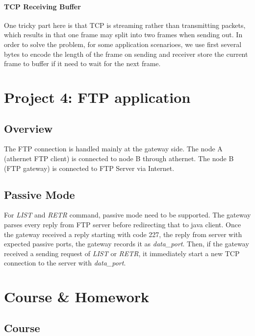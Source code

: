 \documentclass[conference,compsoc]{IEEEtran}
\begin{document}
		\paragraph{\textbf{TCP Receiving Buffer}}
		 One tricky part here is that TCP is streaming rather than transmitting packets, which results in that one frame may split into two frames when sending out. In order to solve the problem, for some application scenarioes, we use first several bytes to encode the length of the frame on sending and receiver store the current frame to buffer if it need to wait for the next frame.
		

\section{Project 4: FTP application}
	\subsection{Overview}	
	The FTP connection is handled mainly at the gateway side. The node A (athernet FTP client) is connected to node B through athernet. The node B (FTP gateway) is connected to FTP Server via Internet.
	\subsection{Passive Mode}
	For \emph{LIST} and \emph{RETR} command, passive mode need to be supported. The gateway parses every reply from FTP server before redirecting that to java client. Once the gateway received a reply starting with code 227, the reply from server with expected passive ports, the gateway records it as \emph{data\_port}. Then, if the gateway received a sending request of \emph{LIST} or \emph{RETR}, it immediately start a new TCP connection to the server with \emph{data\_port}.

\section{Course \& Homework}
	
	\subsection{Course}
	
\end{document}
